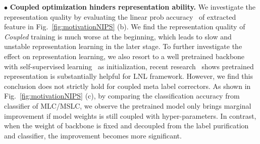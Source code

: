 \documentclass[10pt,twocolumn,letterpaper]{article}
\begin{document}
\noindent $\bullet$ \textbf{Coupled optimization hinders representation ability.} We investigate the representation quality by evaluating the linear prob accuracy~\cite{2020MoCo-v2} of extracted feature in Fig.~\ref{fig:motivationNIPS} (b). We find the representation quality of \emph{Coupled} training is much worse at the beginning, which leads to slow and unstable representation learning in the later stage. To further investigate the effect on representation learning, we also resort to a well pretrained backbone with self-supervised learning~\cite{chen2020simple} as initialization, recent research~\cite{zheltonozhskii2022contrast} shows pretrained representation is substantially helpful for LNL framework. However, we find this conclusion does not strictly hold for coupled meta label correctors. As shown in Fig.~\ref{fig:motivationNIPS} (c), by comparing the classification accuracy from classifier of MLC/MSLC, we observe the pretrained model only brings marginal improvement if model weights is still coupled with hyper-parameters. In contrast, when the weight of backbone is fixed and decoupled from the label purification and classifier, the improvement becomes more significant.
\end{document}
